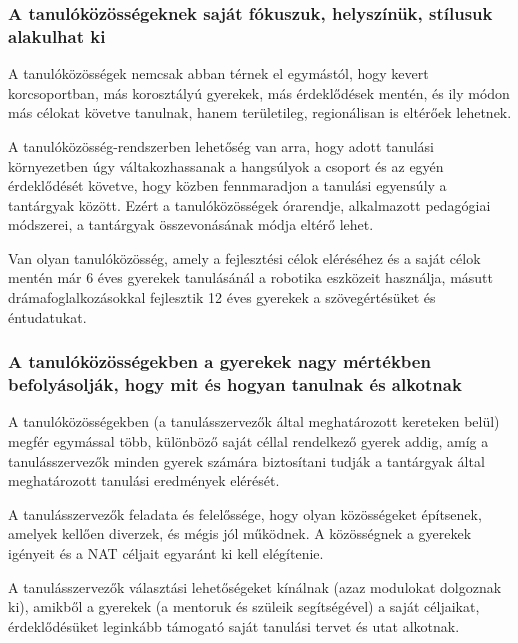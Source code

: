 \hypertarget{a-tanulokozossegeknek-sajat-fokuszuk-helyszinuk-stilusuk-alakulhat-ki}{%
\subsubsection{A tanulóközösségeknek saját fókuszuk, helyszínük,
stílusuk alakulhat
ki}\label{a-tanulokozossegeknek-sajat-fokuszuk-helyszinuk-stilusuk-alakulhat-ki}}

A tanulóközösségek nemcsak abban térnek el egymástól, hogy kevert
korcsoportban, más korosztályú gyerekek, más érdeklődések mentén, és ily
módon más célokat követve tanulnak, hanem területileg, regionálisan is
eltérőek lehetnek.

A tanulóközösség-rendszerben lehetőség van arra, hogy adott tanulási
környezetben úgy váltakozhassanak a hangsúlyok a csoport és az egyén
érdeklődését követve, hogy közben fennmaradjon a tanulási egyensúly a
tantárgyak között. Ezért a tanulóközösségek órarendje, alkalmazott
pedagógiai módszerei, a tantárgyak összevonásának módja eltérő lehet.

Van olyan tanulóközösség, amely a fejlesztési célok eléréséhez és a
saját célok mentén már 6 éves gyerekek tanulásánál a robotika eszközeit
használja, másutt drámafoglalkozásokkal fejlesztik 12 éves gyerekek a
szövegértésüket és éntudatukat.

\hypertarget{a-tanulokozossegekben-a-gyerekek-nagymertekben-befolyasoljak-hogy-mit-es-hogyan-tanulnak-es-alkotnak}{%
\subsubsection{A tanulóközösségekben a gyerekek nagy mértékben
befolyásolják, hogy mit és hogyan tanulnak és
alkotnak}\label{a-tanulokozossegekben-a-gyerekek-nagymertekben-befolyasoljak-hogy-mit-es-hogyan-tanulnak-es-alkotnak}}

A tanulóközösségekben (a tanulásszervezők által meghatározott kereteken
belül) megfér egymással több, különböző saját céllal rendelkező gyerek
addig, amíg a tanulásszervezők minden gyerek számára biztosítani tudják
a tantárgyak által meghatározott tanulási eredmények elérését.

A tanulásszervezők feladata és felelőssége, hogy olyan közösségeket
építsenek, amelyek kellően diverzek, és mégis jól működnek. A
közösségnek a gyerekek igényeit és a NAT céljait egyaránt ki kell
elégítenie.

A tanulásszervezők választási lehetőségeket kínálnak (azaz modulokat
dolgoznak ki), amikből a gyerekek (a mentoruk és szüleik segítségével) a
saját céljaikat, érdeklődésüket leginkább támogató saját tanulási tervet
és utat alkotnak.


